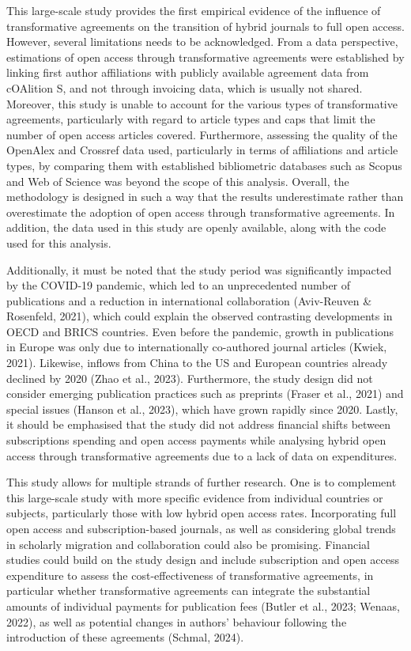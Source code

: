 \documentclass[a4paper,man,floatsintext,longtable,noextraspace,12pt]{apa6}
\begin{document}
This large-scale study provides the first empirical evidence of the
influence of transformative agreements on the transition of hybrid
journals to full open access. However, several limitations needs to be
acknowledged. From a data perspective, estimations of open access
through transformative agreements were established by linking first
author affiliations with publicly available agreement data from
cOAlition S, and not through invoicing data, which is usually not
shared. Moreover, this study is unable to account for the various types
of transformative agreements, particularly with regard to article types
and caps that limit the number of open access articles covered.
Furthermore, assessing the quality of the OpenAlex and Crossref data
used, particularly in terms of affiliations and article types, by
comparing them with established bibliometric databases such as Scopus
and Web of Science was beyond the scope of this analysis. Overall, the
methodology is designed in such a way that the results underestimate
rather than overestimate the adoption of open access through
transformative agreements. In addition, the data used in this study are
openly available, along with the code used for this analysis.

Additionally, it must be noted that the study period was significantly
impacted by the COVID-19 pandemic, which led to an unprecedented number
of publications and a reduction in international collaboration
(Aviv-Reuven \& Rosenfeld, 2021), which could explain the observed
contrasting developments in OECD and BRICS countries. Even before the
pandemic, growth in publications in Europe was only due to
internationally co-authored journal articles (Kwiek, 2021). Likewise,
inflows from China to the US and European countries already declined by
2020 (Zhao et al., 2023). Furthermore, the study design did not consider
emerging publication practices such as preprints (Fraser et al., 2021)
and special issues (Hanson et al., 2023), which have grown rapidly since
2020. Lastly, it should be emphasised that the study did not address
financial shifts between subscriptions spending and open access payments
while analysing hybrid open access through transformative agreements due
to a lack of data on expenditures.

This study allows for multiple strands of further research. One is to
complement this large-scale study with more specific evidence from
individual countries or subjects, particularly those with low hybrid
open access rates. Incorporating full open access and subscription-based
journals, as well as considering global trends in scholarly migration
and collaboration could also be promising. Financial studies could build
on the study design and include subscription and open access expenditure
to assess the cost-effectiveness of transformative agreements, in
particular whether transformative agreements can integrate the
substantial amounts of individual payments for publication fees (Butler
et al., 2023; Wenaas, 2022), as well as potential changes in authors'
behaviour following the introduction of these agreements (Schmal, 2024).
\end{document}
